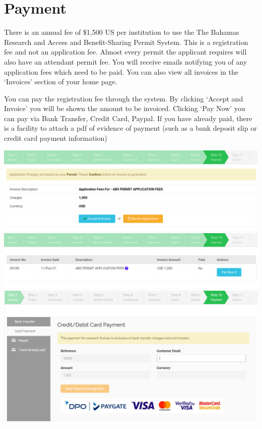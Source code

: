\documentclass[
]{book}
\begin{document}
\hypertarget{payment}{%
\chapter{Payment}\label{payment}}

There is an annual fee of \$1,500 US per institution to use the The Bahamas Research and Access and Benefit-Sharing Permit System. This is a registration fee and not an application fee. Almost every permit the applicant requires will also have an attendant permit fee. You will receive emails notifying you of any application fees which need to be paid. You can also view all invoices in the `Invoices' section of your home page.

You can pay the registration fee through the system. By clicking `Accept and Invoice' you will be shown the amount to be invoiced. Clicking `Pay Now' you can pay via Bank Transfer, Credit Card, Paypal. If you have already paid, there is a facility to attach a pdf of evidence of payment (such as a bank deposit slip or credit card payment information)

\includegraphics{images/payment1.png}
\includegraphics{images/payment2.png}
\includegraphics{images/payment3.png}
\end{document}
